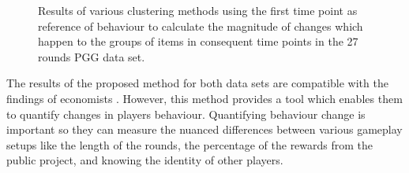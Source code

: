 \begin{figure}[!h]
{\begin{minipage}{\dimexpr \textwidth-2\fboxsep-2\fboxrule}
    \end{minipage}}
    \caption{Results of various clustering methods using the first time point as reference of behaviour to calculate the magnitude of changes which happen to the groups of items in consequent time points in the 27 rounds PGG data set.}
    \label{fig:game27_ChangeMeasuers_Firs}
\end{figure}
            
            
The results of the proposed method for both data sets are compatible with the findings of economists \cite{Fischbacher2010,Hoice2008,Chaudhuri2006}. However, this method provides a tool which enables them to quantify changes in players behaviour. Quantifying behaviour change is important so they can measure the nuanced differences between various gameplay setups like the length of the rounds, the percentage of the rewards from the public project, and knowing the identity of other players.




